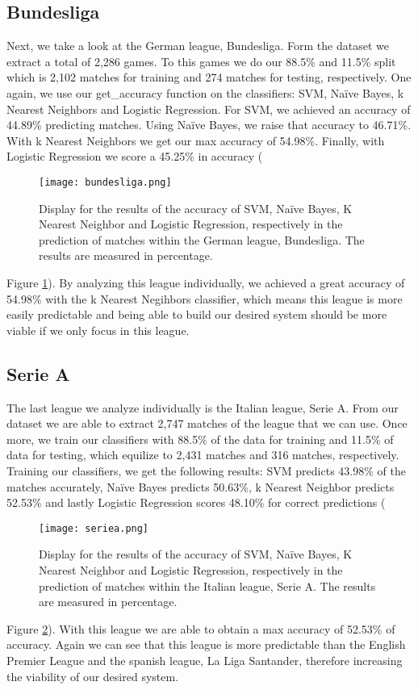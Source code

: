 \documentclass[10pt,journal,compsoc]{IEEEtran}
\begin{document}
\subsection{Bundesliga}
Next, we take a look at the German league, Bundesliga. Form the dataset we extract a total of 2,286 games. To this games we do our 88.5\% and 11.5\% split which is 2,102 matches for training and 274 matches for testing, respectively. One again, we use our get\_accuracy function on the classifiers: SVM, Naïve Bayes, k Nearest Neighbors and Logistic Regression. For SVM, we achieved an accuracy of 44.89\% predicting matches. Using Naïve Bayes, we raise that accuracy to 46.71\%. With k Nearest Neighbors we get our max accuracy of 54.98\%. Finally, with Logistic Regression we score a 45.25\% in accuracy (\begin{figure}
  \texttt{[image: bundesliga.png]}
  \caption{Display for the results of the accuracy of SVM, Naïve Bayes, K Nearest Neighbor and Logistic Regression, respectively in the prediction of matches within the German league, Bundesliga. The results are measured in percentage.}
  \label{fig:bundesliga}
\end{figure}
Figure \ref{fig:bundesliga}). By analyzing this league individually, we achieved a great accuracy of 54.98\% with the k Nearest Negihbors classifier, which means this league is more easily predictable and being able to build our desired system should be more viable if we only focus in this league. 


\subsection{Serie A}
The last league we analyze individually is the Italian league, Serie A. From our dataset we are able to extract 2,747 matches of the league that we can use. Once more, we train our classifiers with 88.5\% of the data for training and 11.5\% of data for testing, which equilize to 2,431 matches and 316 matches, respectively. Training our classifiers, we get the following results: SVM predicts 43.98\% of the matches accurately, Naïve Bayes predicts 50.63\%, k Nearest Neighbor predicts 52.53\% and lastly Logistic Regression scores 48.10\% for correct predictions (\begin{figure}
  \texttt{[image: seriea.png]}
  \caption{Display for the results of the accuracy of SVM, Naïve Bayes, K Nearest Neighbor and Logistic Regression, respectively in the prediction of matches within the Italian league, Serie A. The results are measured in percentage.
}
  \label{fig:seriea}
\end{figure}
Figure \ref{fig:seriea}). With this league we are able to obtain a max accuracy of 52.53\% of accuracy. Again we can see that this league is more predictable than the English Premier League and the spanish league, La Liga Santander, therefore increasing the viability of our desired system.
\end{document}
